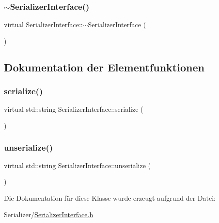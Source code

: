 \subsubsection{\texorpdfstring{$\sim$\+Serializer\+Interface()}{~SerializerInterface()}}
{\footnotesize\ttfamily virtual Serializer\+Interface\+::$\sim$\+Serializer\+Interface (\begin{DoxyParamCaption}{ }\end{DoxyParamCaption})\hspace{0.3cm}{\ttfamily [virtual]}}



\subsection{Dokumentation der Elementfunktionen}
\hypertarget{class_serializer_interface_a7ca657af272daca5396afd0c53f845a5}{}\label{class_serializer_interface_a7ca657af272daca5396afd0c53f845a5} 
\subsubsection{\texorpdfstring{serialize()}{serialize()}}
{\footnotesize\ttfamily virtual std\+::string Serializer\+Interface\+::serialize (\begin{DoxyParamCaption}{ }\end{DoxyParamCaption})\hspace{0.3cm}{\ttfamily [pure virtual]}}

\hypertarget{class_serializer_interface_a0d3718721a1b03be94e5b3efb09c9f7b}{}\label{class_serializer_interface_a0d3718721a1b03be94e5b3efb09c9f7b} 
\subsubsection{\texorpdfstring{unserialize()}{unserialize()}}
{\footnotesize\ttfamily virtual std\+::string Serializer\+Interface\+::unserialize (\begin{DoxyParamCaption}{ }\end{DoxyParamCaption})\hspace{0.3cm}{\ttfamily [pure virtual]}}



Die Dokumentation für diese Klasse wurde erzeugt aufgrund der Datei\+:\begin{DoxyCompactItemize}
\item 
Serializer/\hyperlink{_serializer_interface_8h}{Serializer\+Interface.\+h}\end{DoxyCompactItemize}
